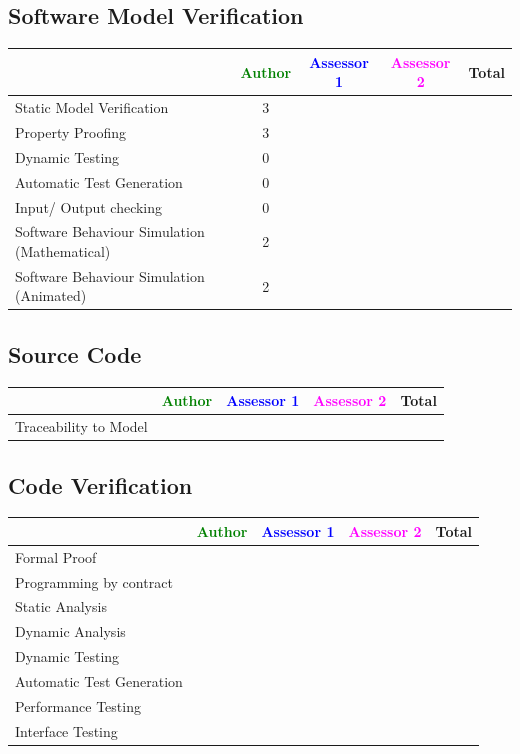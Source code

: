 \subsection{Software Model Verification	}


\begin{tabular}{|l | c | c | c | c|}
\hline
& \textcolor{green}{Author} & \textcolor{blue}{Assessor 1} & \textcolor{magenta}{Assessor 2} & Total \\
\hline 
Static Model Verification & 3& & &  \\
\hline
Property Proofing &3 & & &  \\
\hline
Dynamic Testing &0 & & &  \\
\hline
Automatic Test Generation & 0& & &  \\
\hline
Input/ Output checking & 0& & &  \\
\hline
Software Behaviour Simulation (Mathematical) & 2& & &  \\
\hline
Software Behaviour Simulation (Animated) & 2& & &  \\
\hline
\end{tabular}


\subsection{Source Code}


\begin{tabular}{|l | c | c | c | c|}
\hline
& \textcolor{green}{Author} & \textcolor{blue}{Assessor 1} & \textcolor{magenta}{Assessor 2} & Total \\
\hline 
Traceability to Model & & & &  \\
\hline
\end{tabular}


\subsection{Code Verification	}


\begin{tabular}{|l | c | c | c | c|}
\hline
& \textcolor{green}{Author} & \textcolor{blue}{Assessor 1} & \textcolor{magenta}{Assessor 2} & Total \\
\hline 
Formal Proof & & & &  \\
\hline
Programming by contract & & & &  \\
\hline
Static Analysis & & & &  \\
\hline
Dynamic Analysis & & & &  \\
\hline
Dynamic Testing & & & &  \\
\hline
Automatic Test Generation & & & &  \\
\hline
Performance Testing & & & &  \\
\hline
Interface Testing & & & &  \\
\hline
\end{tabular}

